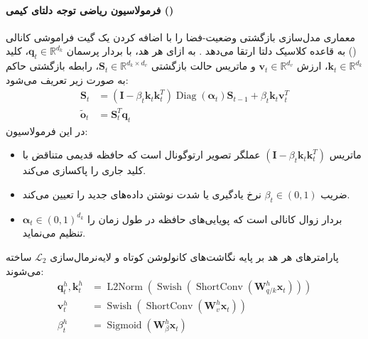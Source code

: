 \paragraph*{فرمولاسیون ریاضی توجه دلتای کیمی ()}
معماری  مدل‌سازی بازگشتی وضعیت-فضا را با اضافه کردن یک گیت فراموشی کانالی () به قاعده کلاسیک دلتا ارتقا می‌دهد \cite{kimi2026k3}. به ازای هر هد، با بردار پرسمان $\mathbf{q}_t \in \mathbb{R}^{d_k}$، کلید $\mathbf{k}_t \in \mathbb{R}^{d_k}$، ارزش $\mathbf{v}_t \in \mathbb{R}^{d_v}$ و ماتریس حالت بازگشتی $\mathbf{S}_t \in \mathbb{R}^{d_k \times d_v}$، رابطه بازگشتی حاکم به صورت زیر تعریف می‌شود:
\begin{align}
    \mathbf{S}_t &= \left(\mathbf{I} - \beta_t \mathbf{k}_t \mathbf{k}_t^T \right) \operatorname{Diag}(\boldsymbol{\alpha}_t) \mathbf{S}_{t-1} + \beta_t \mathbf{k}_t \mathbf{v}_t^T \\
    \tilde{\mathbf{o}}_t &= \mathbf{S}_t^T \mathbf{q}_t
\end{align}
در این فرمولاسیون:
\begin{itemize}
    \item ماتریس $\left(\mathbf{I} - \beta_t \mathbf{k}_t \mathbf{k}_t^T \right)$ عملگر تصویر ارتوگونال است که حافظه قدیمی متناقض با کلید جاری را پاکسازی می‌کند.
    \item ضریب $\beta_t \in (0, 1)$ نرخ یادگیری یا شدت نوشتن داده‌های جدید را تعیین می‌کند.
    \item $\boldsymbol{\alpha}_t \in (0, 1)^{d_k}$ بردار زوال کانالی است که پویایی‌های حافظه در طول زمان را تنظیم می‌نماید.
\end{itemize}

پارامترهای هر هد بر پایه نگاشت‌های کانولوشن کوتاه و لایه‌نرمال‌سازی $\mathcal{L}_2$ ساخته می‌شوند:
\begin{align}
    \mathbf{q}_t^h, \mathbf{k}_t^h &= \operatorname{L2Norm}\left( \operatorname{Swish}\left( \operatorname{ShortConv}\left( \mathbf{W}_{q/k}^h \mathbf{x}_t \right) \right) \right) \\
    \mathbf{v}_t^h &= \operatorname{Swish}\left( \operatorname{ShortConv}\left( \mathbf{W}_v^h \mathbf{x}_t \right) \right) \\
    \beta_t^h &= \operatorname{Sigmoid}\left( \mathbf{W}_\beta^h \mathbf{x}_t \right)
\end{align}


